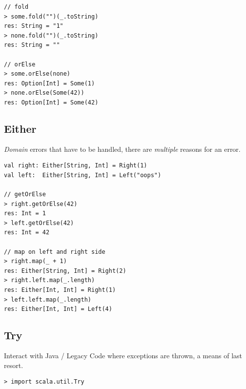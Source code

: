 \documentclass[10pt,landscape,a4paper]{article}
\begin{document}
\begin{multicols*}{4}
\begin{verbatim}
// fold
> some.fold("")(_.toString)
res: String = "1"
> none.fold("")(_.toString)
res: String = ""

// orElse
> some.orElse(none)
res: Option[Int] = Some(1)
> none.orElse(Some(42))
res: Option[Int] = Some(42)

\end{verbatim}
\subsection{Either}
\begin{mdframed}
  \textit{Domain} errors that have to be handled, there are
  \textit{multiple} reasons for an error.
\end{mdframed}
\begin{center}
\end{center}
\begin{verbatim}
val right: Either[String, Int] = Right(1)
val left:  Either[String, Int] = Left("oops")

// getOrElse
> right.getOrElse(42)
res: Int = 1
> left.getOrElse(42)
res: Int = 42

// map on left and right side
> right.map(_ + 1)
res: Either[String, Int] = Right(2)
> right.left.map(_.length)
res: Either[Int, Int] = Right(1)
> left.left.map(_.length)
res: Either[Int, Int] = Left(4)
\end{verbatim}
\subsection{Try}
\begin{mdframed}
  Interact with Java / Legacy Code where exceptions are thrown, a
  means of last resort.
\end{mdframed}
\begin{center}
\end{center}
\begin{verbatim}
> import scala.util.Try


\end{verbatim}
\end{multicols*}
\end{document}
